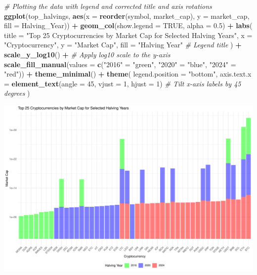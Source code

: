 \documentclass[
]{article}
\newenvironment{Shaded}{\begin{snugshade}}{\end{snugshade}}
\newcommand{\AttributeTok}[1]{\textcolor[rgb]{0.13,0.29,0.53}{#1}}
\newcommand{\CommentTok}[1]{\textcolor[rgb]{0.56,0.35,0.01}{\textit{#1}}}
\newcommand{\ConstantTok}[1]{\textcolor[rgb]{0.56,0.35,0.01}{#1}}
\newcommand{\DecValTok}[1]{\textcolor[rgb]{0.00,0.00,0.81}{#1}}
\newcommand{\FloatTok}[1]{\textcolor[rgb]{0.00,0.00,0.81}{#1}}
\newcommand{\FunctionTok}[1]{\textcolor[rgb]{0.13,0.29,0.53}{\textbf{#1}}}
\newcommand{\NormalTok}[1]{#1}
\newcommand{\OtherTok}[1]{\textcolor[rgb]{0.56,0.35,0.01}{#1}}
\newcommand{\SpecialCharTok}[1]{\textcolor[rgb]{0.81,0.36,0.00}{\textbf{#1}}}
\newcommand{\StringTok}[1]{\textcolor[rgb]{0.31,0.60,0.02}{#1}}
\begin{document}
\begin{Shaded}
\begin{Highlighting}[]
\CommentTok{\# Plotting the data with legend and corrected title and axis rotations}
\FunctionTok{ggplot}\NormalTok{(top\_halvings, }\FunctionTok{aes}\NormalTok{(}\AttributeTok{x =} \FunctionTok{reorder}\NormalTok{(symbol, market\_cap), }\AttributeTok{y =}\NormalTok{ market\_cap, }\AttributeTok{fill =}\NormalTok{ Halving\_Year)) }\SpecialCharTok{+}
  \FunctionTok{geom\_col}\NormalTok{(}\AttributeTok{show.legend =} \ConstantTok{TRUE}\NormalTok{, }\AttributeTok{alpha =} \FloatTok{0.5}\NormalTok{) }\SpecialCharTok{+}
  \FunctionTok{labs}\NormalTok{(}
    \AttributeTok{title =} \StringTok{"Top 25 Cryptocurrencies by Market Cap for Selected Halving Years"}\NormalTok{, }
    \AttributeTok{x =} \StringTok{"Cryptocurrency"}\NormalTok{, }
    \AttributeTok{y =} \StringTok{"Market Cap"}\NormalTok{,}
    \AttributeTok{fill =} \StringTok{"Halving Year"}  \CommentTok{\# Legend title}
\NormalTok{  ) }\SpecialCharTok{+}
  \FunctionTok{scale\_y\_log10}\NormalTok{() }\SpecialCharTok{+}  \CommentTok{\# Apply log10 scale to the y{-}axis}
  \FunctionTok{scale\_fill\_manual}\NormalTok{(}\AttributeTok{values =} \FunctionTok{c}\NormalTok{(}\StringTok{"2016"} \OtherTok{=} \StringTok{"green"}\NormalTok{, }\StringTok{"2020"} \OtherTok{=} \StringTok{"blue"}\NormalTok{, }\StringTok{"2024"} \OtherTok{=} \StringTok{"red"}\NormalTok{)) }\SpecialCharTok{+}
  \FunctionTok{theme\_minimal}\NormalTok{() }\SpecialCharTok{+}
  \FunctionTok{theme}\NormalTok{(}
    \AttributeTok{legend.position =} \StringTok{"bottom"}\NormalTok{,}
    \AttributeTok{axis.text.x =} \FunctionTok{element\_text}\NormalTok{(}\AttributeTok{angle =} \DecValTok{45}\NormalTok{, }\AttributeTok{vjust =} \DecValTok{1}\NormalTok{, }\AttributeTok{hjust =} \DecValTok{1}\NormalTok{)  }\CommentTok{\# Tilt x{-}axis labels by 45 degrees}
\NormalTok{  )}
\end{Highlighting}
\end{Shaded}

\includegraphics{Crypto_ETL_files/figure-latex/unnamed-chunk-4-1.pdf}
\end{document}
